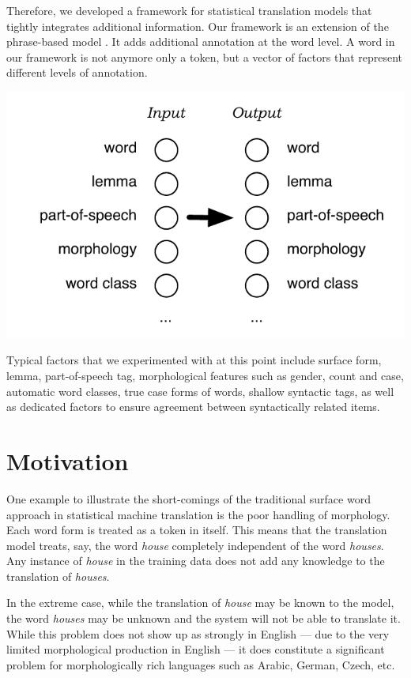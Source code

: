 \documentclass[11pt]{report}
\theoremstyle{plain}
\begin{document}
Therefore, we developed a framework for statistical translation models that tightly integrates additional information. Our framework is an extension of the phrase-based model \cite{OchThesis}. It adds additional annotation at the word level. A word in our framework is not anymore only a token, but a vector of factors that represent different levels of annotation.

\begin{center}
\includegraphics[scale=0.75]{factors.pdf}
\end{center}

Typical factors that we experimented with at this point include surface form, lemma, part-of-speech tag, morphological features such as gender, count and case, automatic word classes, true case forms of words, shallow syntactic tags, as well as dedicated factors to ensure agreement between syntactically related items. 

\section{Motivation}
One example to illustrate the short-comings of the traditional surface word approach in statistical machine translation is the poor handling of morphology. Each word form is treated as a token in itself. This means that the translation model treats, say, the word {\em house} completely independent of the word {\em houses}. Any instance of {\em house} in the training data does not add any knowledge to the translation of {\em houses}. 

In the extreme case, while the translation of {\em house} may be known to the model, the word {\em houses} may be unknown and the system will not be able to translate it. While this problem does not show up as strongly in English --- due to the very limited morphological production in English --- it does constitute a significant problem for morphologically rich languages such as Arabic, German, Czech, etc.
\end{document}
